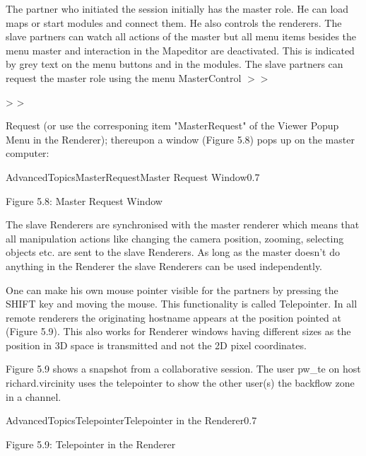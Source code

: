 The partner who initiated the session initially has the master role. He can load maps 
or start modules and connect them. He also controls the renderers. The slave partners 
can watch all actions of the master but all menu items besides the menu master and 
interaction in the Mapeditor are deactivated. This is indicated by grey text on the menu buttons and in
the modules. The slave partners can request the master role using the menu 
MasterControl \latexonly $>>$ \endlatexonly \begin{htmlonly} > > \end{htmlonly} Request
(or use the corresponing item "MasterRequest" of the Viewer Popup Menu in the Renderer);
thereupon a window (Figure 5.8) pops up on the master computer:

\begin{covimg}{AdvancedTopics}{MasterRequest}{Master Request Window}{0.7}\end{covimg}
\begin{htmlonly}
Figure 5.8: Master Request Window
\vspace{0.5cm}
\end{htmlonly}


The slave Renderers are synchronised with the master renderer which means that all 
manipulation actions like changing the camera position, zooming, selecting objects 
etc. are sent to the slave Renderers. As long as the master doesn't do anything in 
the Renderer the slave Renderers can be used independently. 

One can make his own mouse pointer visible for the partners by pressing the SHIFT key 
and moving the mouse. This functionality is called Telepointer. In all remote renderers 
the originating hostname appears at the position pointed at (Figure 5.9). This also works
for Renderer windows having different sizes as the position in 3D space is transmitted 
and not the 2D pixel coordinates. 

Figure 5.9 shows a snapshot from a collaborative session. The 
user pw\_te on host richard.vircinity uses the telepointer to show the other
user(s) the 
backflow zone in a channel. 

\begin{covimg}{AdvancedTopics}{Telepointer}{Telepointer in the Renderer}{0.7}\end{covimg}
\begin{htmlonly}
Figure 5.9: Telepointer in the Renderer
\vspace{0.5cm}
\end{htmlonly}


